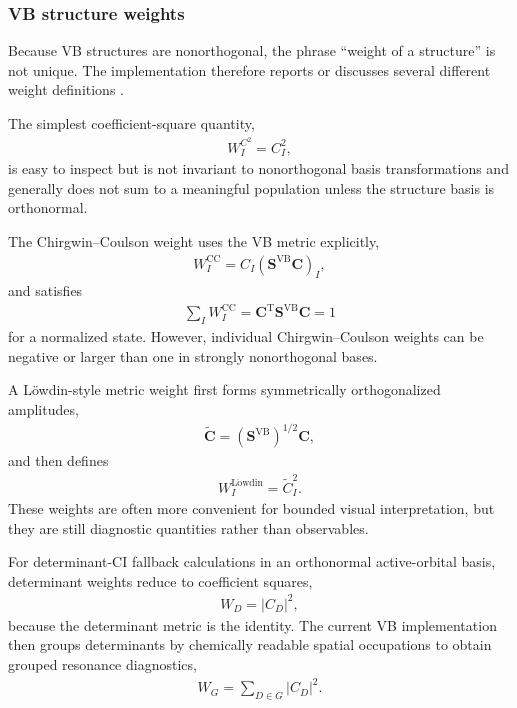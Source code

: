 \documentclass[11pt]{article}
\newcommand{\vb}{\mathrm{VB}}
\begin{document}
\subsubsection*{VB structure weights}

Because VB structures are nonorthogonal, the phrase ``weight of a structure'' is not unique.  The implementation therefore reports or discusses several different weight definitions \cite{ChirgwinCoulson1950,Lowdin1950}.

The simplest coefficient-square quantity,
\begin{equation}
\begin{aligned}
	W_I^{C^2} = C_I^2,
\end{aligned}
\end{equation}
is easy to inspect but is not invariant to nonorthogonal basis transformations and generally does not sum to a meaningful population unless the structure basis is orthonormal.

The Chirgwin--Coulson weight uses the VB metric explicitly,
\begin{align}
	W_I^{\mathrm{CC}}
	= C_I\left(\mathbf{S}^{\vb}\mathbf{C}\right)_I,
	\label{eq:cc-weight-section2}
\end{align}
and satisfies
\begin{equation}
\begin{aligned}
	\sum_I W_I^{\mathrm{CC}}
	= \mathbf{C}^{\mathrm{T}}\mathbf{S}^{\vb}\mathbf{C}=1
\end{aligned}
\end{equation}
for a normalized state.  However, individual Chirgwin--Coulson weights can be negative or larger than one in strongly nonorthogonal bases.

A L\"owdin-style metric weight first forms symmetrically orthogonalized amplitudes,
\begin{equation}
\begin{aligned}
	\widetilde{\mathbf{C}}
	= \left(\mathbf{S}^{\vb}\right)^{1/2}\mathbf{C},
\end{aligned}
\end{equation}
and then defines
\begin{align}
	W_I^{\mathrm{L\ddot{o}wdin}}
	= \widetilde{C}_I^2.
	\label{eq:lowdin-weight-section2}
\end{align}
These weights are often more convenient for bounded visual interpretation, but they are still diagnostic quantities rather than observables.

For determinant-CI fallback calculations in an orthonormal active-orbital basis, determinant weights reduce to coefficient squares,
\begin{equation}
\begin{aligned}
	W_D = |C_D|^2,
\end{aligned}
\end{equation}
because the determinant metric is the identity.  The current VB implementation then groups determinants by chemically readable spatial occupations to obtain grouped resonance diagnostics,
\begin{equation}
\begin{aligned}
	W_G = \sum_{D\in G} |C_D|^2.
\end{aligned}
\end{equation}
\end{document}
